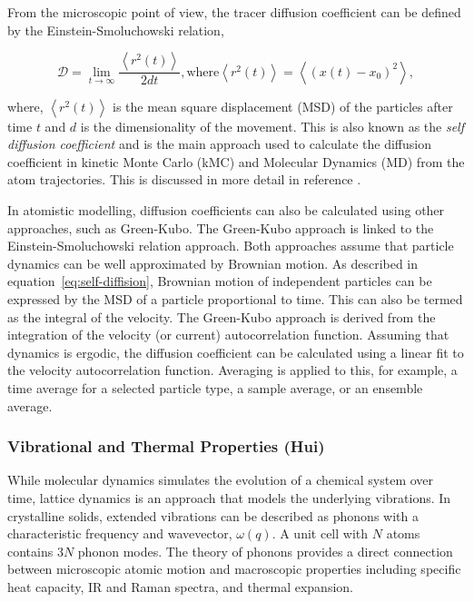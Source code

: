 \documentclass[../main.tex]{subfiles}
\begin{document}
From the microscopic point of view, the tracer diffusion coefficient can be defined by the Einstein-Smoluchowski relation, \cite{einstein1905presumed,von1906kinetischen}

\begin{equation}
    \mathcal{D} = \lim_{t\to\infty} \frac{\left <r^2(t)\right >}{2dt}, \mathrm{where} \left <r^2(t)\right > = \left< \left(x(t) - x_0 \right)^2 \right>,
    \label{eq:self-diffision}
\end{equation}

where, $\left <r^2(t)\right >$ is the mean square displacement (MSD) of the particles after time $t$ and $d$ is the dimensionality of the movement. This is also known as the \textit{self diffusion coefficient} and is the main approach used to calculate the diffusion coefficient in kinetic Monte Carlo (kMC) and Molecular Dynamics (MD) from the atom trajectories. This is discussed in more detail in reference .

In atomistic modelling, diffusion coefficients can also be calculated using other approaches, such as Green-Kubo. The Green-Kubo approach is linked to the Einstein-Smoluchowski relation approach. Both approaches assume that particle dynamics can be well approximated by Brownian motion. As described in equation~\ref{eq:self-diffision}, Brownian motion of independent particles can be expressed by the MSD of a particle proportional to time. This can also be termed as the integral of the velocity. The Green-Kubo approach is derived from the integration of the velocity (or current) autocorrelation function. Assuming that dynamics is ergodic, the diffusion coefficient can be calculated using a linear fit to the velocity autocorrelation function. Averaging is applied to this, for example, a time  average for a selected particle type, a sample average, or an ensemble average.


\subsubsection{Vibrational and Thermal Properties (Hui)}
\label{sec:thermal_electronic_vibrational}
While molecular dynamics simulates the evolution of a chemical system over time, lattice dynamics is an approach that models the underlying vibrations. In crystalline solids, extended vibrations can be described as phonons with a characteristic frequency and wavevector, $\omega(q)$. A unit cell with $N$ atoms contains 3$N$ phonon modes. The theory of phonons provides a direct connection between microscopic atomic motion and macroscopic properties including specific heat capacity, IR and Raman spectra, and thermal expansion.\cite{ladd1986lattice, turney2009predicting,seko2015prediction} 
\end{document}
